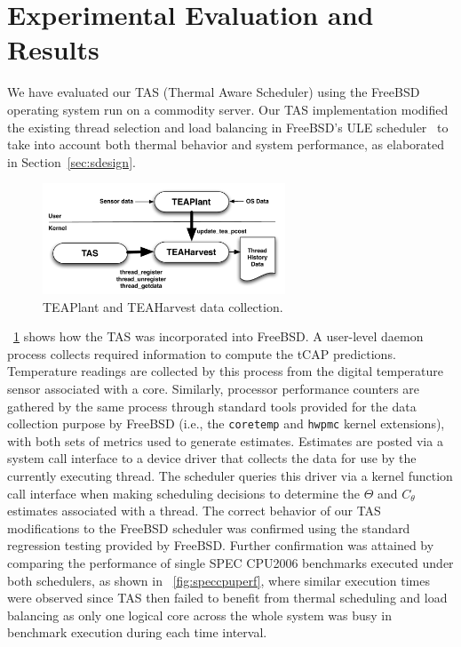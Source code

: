 \documentclass[times, 10pt,twocolumn]{IEEEtran}
\begin{document}
\section{Experimental Evaluation and Results}
\label{sec:experiment} 
We have evaluated our TAS (Thermal Aware Scheduler) using the FreeBSD
operating system run on a commodity server.  Our TAS implementation
modified the existing thread selection and load balancing in FreeBSD's
ULE scheduler~\cite{McKusick2004} to take into account both thermal
behavior and system performance, as elaborated in
Section~\ref{sec:sdesign}. 

\begin{figure}[!t]
  \centering
  \includegraphics[width=1.0\linewidth,height=1.3in]{tasdesign}
  \caption{TEAPlant and TEAHarvest data collection.}
  \label{fig:teaplant}
\end{figure}
\figurename~\ref{fig:teaplant} shows how the TAS was incorporated into
FreeBSD. A user-level daemon process collects required information to
compute the tCAP predictions. Temperature readings are collected by this
process from the digital temperature sensor associated with a core.
Similarly, processor performance counters are gathered by the same
process through standard tools provided for the data collection purpose
by FreeBSD (i.e., the \texttt{coretemp} and \texttt{hwpmc} kernel
extensions), with both sets of metrics used to generate estimates.
Estimates are posted via a system call interface to a device driver that
collects the data for use by the currently executing thread.  The
scheduler queries this driver via a kernel function call interface when
making scheduling decisions to determine the $\Theta$ and $C_{\theta}$
estimates associated with a thread.  The correct behavior of our TAS
modifications to the FreeBSD scheduler was confirmed using the standard
regression testing provided by FreeBSD.  Further confirmation was
attained by comparing the performance of single SPEC CPU2006 benchmarks
executed under both schedulers, as shown in
\figurename~\ref{fig:speccpuperf}, where similar execution times were
observed since TAS then failed to benefit from thermal scheduling and
load balancing as only one logical core across the whole system was busy
in benchmark execution during each time interval.
\end{document}
